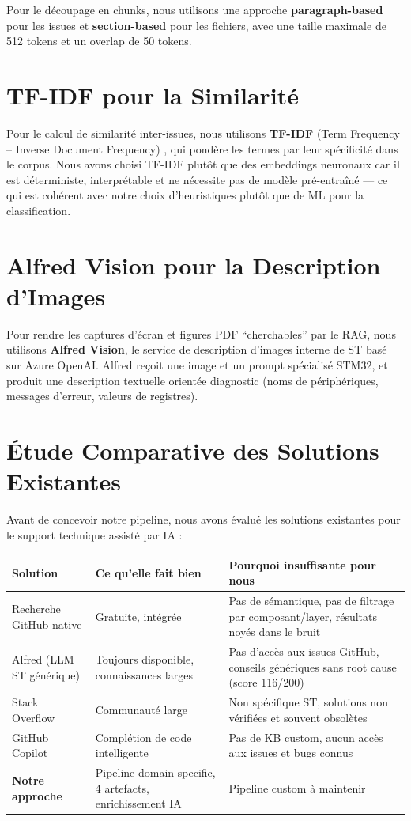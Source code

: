 \documentclass[12pt,a4paper]{report}
\begin{document}
Pour le découpage en chunks, nous utilisons une approche \textbf{paragraph-based} pour les issues et \textbf{section-based} pour les fichiers, avec une taille maximale de 512 tokens et un overlap de 50 tokens.

\section{TF-IDF pour la Similarité}

Pour le calcul de similarité inter-issues, nous utilisons \textbf{TF-IDF} (Term Frequency -- Inverse Document Frequency) \cite{tfidf}, qui pondère les termes par leur spécificité dans le corpus. Nous avons choisi TF-IDF plutôt que des embeddings neuronaux car il est déterministe, interprétable et ne nécessite pas de modèle pré-entraîné --- ce qui est cohérent avec notre choix d'heuristiques plutôt que de ML pour la classification.

\section{Alfred Vision pour la Description d'Images}

Pour rendre les captures d'écran et figures PDF ``cherchables'' par le RAG, nous utilisons \textbf{Alfred Vision}, le service de description d'images interne de ST basé sur Azure OpenAI. Alfred reçoit une image et un prompt spécialisé STM32, et produit une description textuelle orientée diagnostic (noms de périphériques, messages d'erreur, valeurs de registres).

\section{Étude Comparative des Solutions Existantes}
\label{sec:etude_comparative_intro}

Avant de concevoir notre pipeline, nous avons évalué les solutions existantes pour le support technique assisté par IA :

\begin{longtable}{p{3cm}p{4.5cm}p{4.5cm}}
\toprule
\textbf{Solution} & \textbf{Ce qu'elle fait bien} & \textbf{Pourquoi insuffisante pour nous} \\
\midrule
Recherche GitHub native & Gratuite, intégrée & Pas de sémantique, pas de filtrage par composant/layer, résultats noyés dans le bruit \\
Alfred (LLM ST générique) & Toujours disponible, connaissances larges & Pas d'accès aux issues GitHub, conseils génériques sans root cause (score 116/200) \\
Stack Overflow & Communauté large & Non spécifique ST, solutions non vérifiées et souvent obsolètes \\
GitHub Copilot & Complétion de code intelligente & Pas de KB custom, aucun accès aux issues et bugs connus \\
\textbf{Notre approche} & Pipeline domain-specific, 4 artefacts, enrichissement IA & Pipeline custom à maintenir \\
\bottomrule
\end{longtable}
\end{document}
